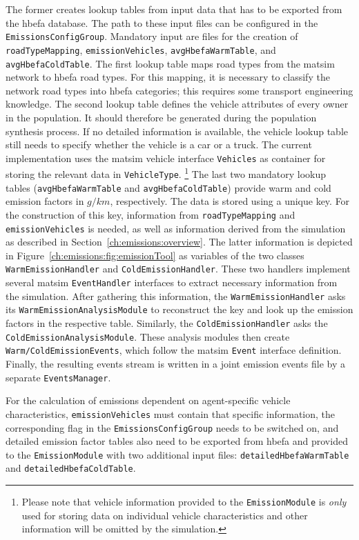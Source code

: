 The former creates lookup tables from input data that has to be exported from the \gls{hbefa} database. The path to these input files can be configured in the \lstinline|EmissionsConfigGroup|. Mandatory input are files for the creation of \lstinline|roadTypeMapping|, \lstinline|emissionVehicles|, \lstinline|avgHbefaWarmTable|, and \lstinline|avgHbefaColdTable|.
%
The first lookup table maps road types from the \gls{matsim} network to \gls{hbefa} road types. For this mapping, it is necessary to classify the network road types into \gls{hbefa} categories; this requires some transport engineering knowledge.
%
The second lookup table defines the vehicle attributes of every owner in the population. It should therefore be generated during the population synthesis process. If no detailed information is available, the vehicle lookup table still needs to specify whether the vehicle is a car or a truck. The current implementation uses the \gls{matsim} vehicle interface 
\lstinline|Vehicles| as container for storing the relevant data in \lstinline|VehicleType|.%
%
\footnote{
%
Please note that vehicle information provided to the \lstinline|EmissionModule| is \emph{only} used for storing data on individual vehicle characteristics and other information will be omitted by the simulation.
%
}
%
The last two mandatory lookup tables (\lstinline|avgHbefaWarmTable| and \lstinline|avgHbefaColdTable|) provide warm and cold emission factors in $g/km$, respectively. The data is stored using a unique key. For the construction of this key, information from \lstinline|roadTypeMapping| and \lstinline|emissionVehicles| is needed, as well as information derived from the simulation as described in Section~\ref{ch:emissions:overview}.
%
The latter information is depicted in Figure~\ref{ch:emissions:fig:emissionTool} as variables of the two classes \lstinline|WarmEmissionHandler| and \lstinline|ColdEmissionHandler|. These two handlers implement several \gls{matsim} \lstinline|EventHandler| interfaces to extract necessary information from the simulation. After gathering this information, the \lstinline|WarmEmissionHandler| asks its \lstinline|WarmEmissionAnalysisModule| to reconstruct the key and look up the emission factors in the respective table. Similarly, the \lstinline|ColdEmissionHandler| asks the \lstinline|ColdEmissionAnalysisModule|. These analysis modules then create \lstinline|Warm/ColdEmissionEvents|, which follow the \gls{matsim} \lstinline|Event| interface definition. Finally, the resulting events stream is written in a joint emission events file by a separate \lstinline|EventsManager|.

For the calculation of emissions dependent on agent-specific vehicle characteristics, \lstinline|emissionVehicles| must contain that specific information, the corresponding flag in the \lstinline|EmissionsConfigGroup| needs to be switched on, and detailed emission factor tables also need to be exported from \gls{hbefa} and provided to the \lstinline|EmissionModule| with two additional input files: \lstinline|detailedHbefaWarmTable| and \lstinline|detailedHbefaColdTable|.

